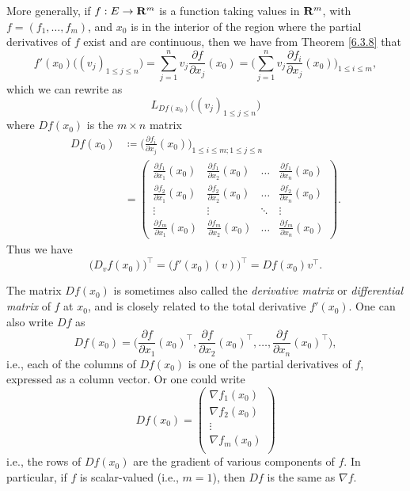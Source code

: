 \begin{additional corollary}\label{ac 6.3.4}
More generally, if \(f : E \to \mathbf{R}^m\) is a function taking values in \(\mathbf{R}^m\), with \(f = (f_1, \dots, f_m)\), and \(x_0\) is in the interior of the region where the partial derivatives of \(f\) exist and are continuous, then we have from Theorem \ref{6.3.8} that
\[
    f'(x_0)\big((v_j)_{1 \leq j \leq n}\big) = \sum_{j = 1}^n v_j \frac{\partial f}{\partial x_j}(x_0) = \bigg(\sum_{j = 1}^n v_j \frac{\partial f_i}{\partial x_j}(x_0)\bigg)_{1 \leq i \leq m},
\]
which we can rewrite as
\[
    L_{D f(x_0)}\big((v_j)_{1 \leq j \leq n}\big)
\]
where \(D f(x_0)\) is the \(m \times n\) matrix
\begin{align*}
    D f(x_0) & \coloneqq \bigg(\frac{\partial f_i}{\partial x_j}(x_0)\bigg)_{1 \leq i \leq m ; 1 \leq j \leq n}                                    \\
             & = \begin{pmatrix}
                     \frac{\partial f_1}{\partial x_1}(x_0) & \frac{\partial f_1}{\partial x_2}(x_0) & \dots  & \frac{\partial f_1}{\partial x_n}(x_0) \\
                     \frac{\partial f_2}{\partial x_1}(x_0) & \frac{\partial f_2}{\partial x_2}(x_0) & \dots  & \frac{\partial f_2}{\partial x_n}(x_0) \\
                     \vdots                                 & \vdots                                 & \ddots & \vdots                                 \\
                     \frac{\partial f_m}{\partial x_1}(x_0) & \frac{\partial f_m}{\partial x_2}(x_0) & \dots  & \frac{\partial f_m}{\partial x_n}(x_0)
                 \end{pmatrix}.
\end{align*}
Thus we have
\[
    \big(D_v f(x_0)\big)^\top = \big(f'(x_0)(v)\big)^\top = D f(x_0) v^\top.
\]

The matrix \(D f(x_0)\) is sometimes also called the \emph{derivative matrix} or \emph{differential matrix} of \(f\) at \(x_0\), and is closely related to the total derivative \(f'(x_0)\).
One can also write \(Df\) as
\[
    D f(x_0) = \bigg(\frac{\partial f}{\partial x_1}(x_0)^\top, \frac{\partial f}{\partial x_2}(x_0)^\top, \dots, \frac{\partial f}{\partial x_n}(x_0)^\top\bigg),
\]
i.e., each of the columns of \(D f(x_0)\) is one of the partial derivatives of \(f\), expressed as a column vector.
Or one could write
\[
    D f(x_0) = \begin{pmatrix}
        \nabla f_1(x_0) \\
        \nabla f_2(x_0) \\
        \vdots          \\
        \nabla f_m(x_0) \\
    \end{pmatrix}
\]
i.e., the rows of \(D f(x_0)\) are the gradient of various components of \(f\).
In particular, if \(f\) is scalar-valued (i.e., \(m = 1\)), then \(Df\) is the same as \(\nabla f\).
\end{additional corollary}

